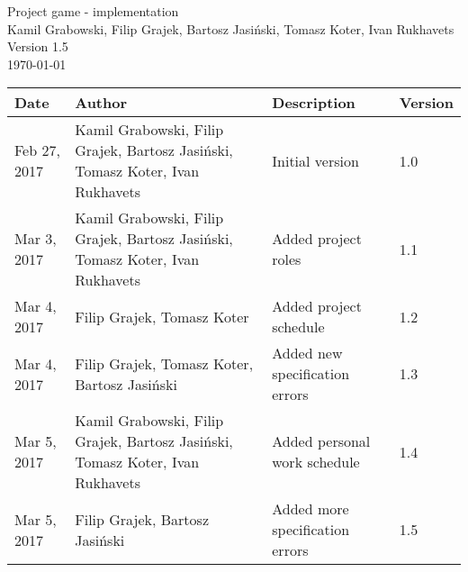 \documentclass[11pt,a4paper]{article}
\begin{document}
\begin{titlepage}
\centering
\huge Project game - implementation \\
\vspace{1.5cm}
\large Kamil Grabowski, Filip Grajek, Bartosz Jasiński, Tomasz Koter, Ivan Rukhavets \\
\vspace{1.0cm}
Version 1.5 \\
\vspace{1.0cm}
\today
\end{titlepage}

\begin{longtable}{| l | p{4.5cm} | p{4.5cm} | l | }
\hline
\textbf{Date} & \textbf{Author} & \textbf{Description} & \textbf{Version} \\ \hline
Feb 27, 2017 & Kamil Grabowski, Filip Grajek, Bartosz Jasiński, Tomasz Koter, Ivan Rukhavets & Initial version & 1.0 \\ \hline
Mar 3, 2017 & Kamil Grabowski, Filip Grajek, Bartosz Jasiński, Tomasz Koter, Ivan Rukhavets & Added project roles & 1.1 \\ \hline
Mar 4, 2017 & Filip Grajek, Tomasz Koter & Added project schedule & 1.2 \\ \hline
Mar 4, 2017 & Filip Grajek, Tomasz Koter, Bartosz Jasiński & Added new specification errors & 1.3 \\ \hline
Mar 5, 2017 & Kamil Grabowski, Filip Grajek, Bartosz Jasiński, Tomasz Koter, Ivan Rukhavets  & Added personal work schedule& 1.4 \\ \hline
Mar 5, 2017 &  Filip Grajek, Bartosz Jasiński & Added more specification errors& 1.5 \\ \hline
\end{longtable}

\tableofcontents

\newpage
\end{document}
